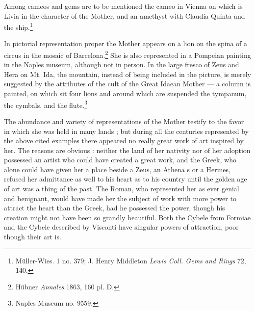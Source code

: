 \documentclass[a4paper, 11pt, oneside, polutonikogreek, english]{article}
\begin{document}
Among cameos and gems are to be mentioned the cameo in Vienna on which is Livia in the character of the Mother, and an amethyst with Claudia Quinta and the ship.\footnote{Müller-Wies. 1 no. 379; J. Henry Middleton \emph{Lewis Coll. Gems and Rings} 72, 140.}

In pictorial representation proper the Mother appears on a lion on the spina of a circus in the mosaic of Barcelona.\footnote{Hübner \emph{Annales} 1863, 160 pl. D.} She is also represented in a Pompeian painting in the Naples museum, although not in person. In the large fresco of Zeus and Hera on Mt. Ida, the mountain, instead of being included in the picture, is merely suggested by the attributes of the cult of the Great Idaean Mother --- a column is painted, on which sit four lions and around which are suspended the tympanum, the cymbals, and the flute.\footnote{Naples Museum no. 9559.}

The abundance and variety of representations of the Mother testify to the favor in which she was held in many lands ; but during all the centuries represented by the above cited examples there appeared no really great work of art inspired by her. The reasons are obvious : neither the land of her nativity nor of her adoption possessed an artist who could have created a great work, and the Greek, who alone could have given her a place beside a Zeus, an Athena s or a Hermes, refused her admittance as well to his heart as to his country until the golden age of art was a thing of the past. The Roman, who represented her as ever genial and benignant, would have made her the subject of work with more power to attract the heart than the Greek, had he possessed the power, though his creation might not have been so grandly beautiful. Both the Cybele from Formiae and the Cybele described by Visconti have singular powers of attraction, poor though their art is.
\end{document}
